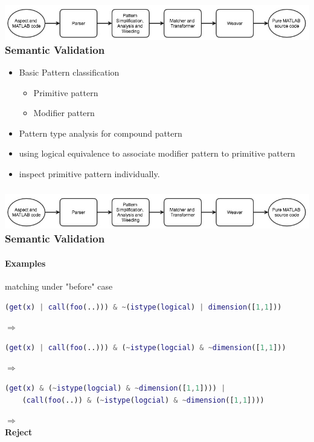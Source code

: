 \documentclass[10pt]{beamer}
\begin{document}
\begin{frame}
\frametitle{\includegraphics[scale=0.4]{new_structure}\\Semantic Validation} 
\begin{itemize}
    \item Basic Pattern classification
        \begin{itemize}
        \item Primitive pattern
        \item Modifier pattern
        \end{itemize}
    \item Pattern type analysis for compound pattern
    \item using logical equivalence to associate modifier pattern to  
          primitive pattern
    \item inspect primitive pattern individually.
\end{itemize}
\end{frame}

\begin{frame}[fragile]
\frametitle{\includegraphics[scale=0.4]{new_structure}\\Semantic Validation} 
\framesubtitle{Examples}
matching under "before" case
\begin{lstlisting}[basicstyle=\small, language=MATLAB]
(get(x) | call(foo(..))) & ~(istype(logical) | dimension([1,1]))    
\end{lstlisting}
$\Rightarrow$
\begin{lstlisting}[basicstyle=\small, language=MATLAB]
(get(x) | call(foo(..))) & (~istype(logcial) & ~dimension([1,1]))    
\end{lstlisting}
$\Rightarrow$
\begin{lstlisting}[basicstyle=\small, language=MATLAB]
(get(x) & (~istype(logcial) & ~dimension([1,1]))) | 
    (call(foo(..)) & (~istype(logcial) & ~dimension([1,1])))
\end{lstlisting}
$\Rightarrow$                                                             \\
\textbf{Reject}
\end{frame}
\end{document}
